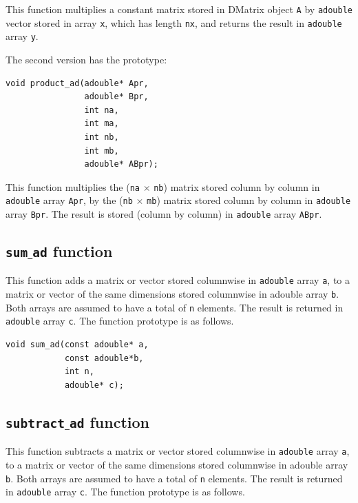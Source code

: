 \documentclass[a4paper,11pt]{report}    %
\begin{document}
This function multiplies a constant matrix stored in DMatrix object \texttt{A}  by \texttt{adouble} vector
stored in array \texttt{x}, which has length \texttt{nx}, and returns the result in \texttt{adouble} array \texttt{y}.


The second version has the prototype:

\begin{verbatim}
void product_ad(adouble* Apr,
                adouble* Bpr, 
                int na, 
                int ma, 
                int nb, 
                int mb, 
                adouble* ABpr);
\end{verbatim}

This function multiplies the (\texttt{na} $\times$ \texttt{nb}) matrix stored column by column in 
\texttt{adouble} array \texttt{Apr},  by the (\texttt{nb} $\times$ \texttt{mb}) matrix stored column by column
in \texttt{adouble} array \texttt{Bpr}. The result is stored (column by column) in \texttt{adouble} array \texttt{ABpr}.





\subsection{ \texttt{sum$\_$ad} function}
This function  adds a matrix or vector stored columnwise in \texttt{adouble} array \texttt{a},
to a matrix or vector of the same dimensions stored columnwise in adouble array \texttt{b}. Both arrays
are assumed to have a total of \texttt{n} elements. The result is returned in \texttt{adouble} array \texttt{c}. 
The function prototype is as follows.

\begin{verbatim}
void sum_ad(const adouble* a, 
            const adouble*b, 
            int n, 
            adouble* c);
\end{verbatim}



\subsection{ \texttt{subtract$\_$ad} function}
This function  subtracts a matrix or vector stored columnwise in \texttt{adouble} array \texttt{a},
to a matrix or vector of the same dimensions stored columnwise in adouble array \texttt{b}. Both arrays
are assumed to have a total of \texttt{n} elements. The result is returned in \texttt{adouble} array \texttt{c}. 
The function prototype is as follows.
\end{document}
